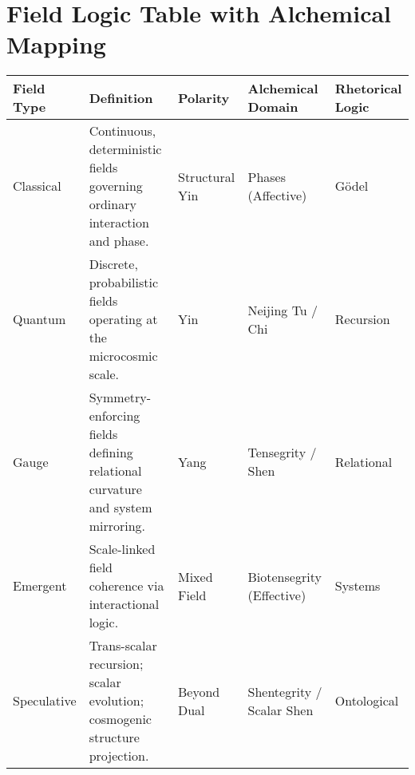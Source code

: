 \documentclass{article}
\begin{document}
\section*{Field Logic Table with Alchemical Mapping}

\begin{longtable}{|>{\raggedright\arraybackslash}p{2.8cm}
                  |>{\raggedright\arraybackslash}p{4.6cm}
                  |>{\raggedright\arraybackslash}p{3.2cm}
                  |>{\raggedright\arraybackslash}p{4.2cm}
                  |>{\raggedright\arraybackslash}p{2.6cm}|}
\hline
\rowcolor{black!20}
\textbf{Field Type} & \textbf{Definition} & \textbf{Polarity} & \textbf{Alchemical Domain} & \textbf{Rhetorical Logic} \\
\hline
Classical & Continuous, deterministic fields governing ordinary interaction and phase. & Structural Yin & 5 Phases (Affective) & Gödel \\
Quantum   & Discrete, probabilistic fields operating at the microcosmic scale. & Yin & Neijing Tu / Chi & Recursion \\
Gauge     & Symmetry-enforcing fields defining relational curvature and system mirroring. & Yang & Tensegrity / Shen & Relational \\
Emergent  & Scale-linked field coherence via interactional logic. & Mixed Field & Biotensegrity (Effective) & Systems \\
Speculative & Trans-scalar recursion; scalar evolution; cosmogenic structure projection. & Beyond Dual & Shentegrity / Scalar Shen & Ontological \\
\hline
\end{longtable}
\end{document}
